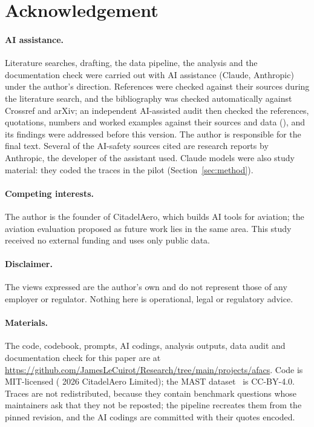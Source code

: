 \documentclass[11pt]{article}
\begin{document}
\section*{Acknowledgement}
\paragraph{AI assistance.} Literature searches, drafting, the data pipeline, the analysis and the documentation check were carried out with AI assistance (Claude, Anthropic) under the author's direction. References were checked against their sources during the literature search, and the bibliography was checked automatically against Crossref and arXiv; an independent AI-assisted audit then checked the references, quotations, numbers and worked examples against their sources and data (), and its findings were addressed before this version. The author is responsible for the final text. Several of the AI-safety sources cited are research reports by Anthropic, the developer of the assistant used. Claude models were also study material: they coded the traces in the pilot (Section~\ref{sec:method}).
\paragraph{Competing interests.} The author is the founder of CitadelAero, which builds AI tools for aviation; the aviation evaluation proposed as future work lies in the same area. This study received no external funding and uses only public data.
\paragraph{Disclaimer.} The views expressed are the author's own and do not represent those of any employer or regulator. Nothing here is operational, legal or regulatory advice.
\paragraph{Materials.} The code, codebook, prompts, AI codings, analysis outputs, data audit and documentation check for this paper are at \url{https://github.com/JamesLeCuirot/Research/tree/main/projects/afacs}. Code is MIT-licensed (\textcopyright{} 2026 CitadelAero Limited); the MAST dataset~\cite{cemri2025mast} is CC-BY-4.0. Traces are not redistributed, because they contain benchmark questions whose maintainers ask that they not be reposted; the pipeline recreates them from the pinned revision, and the AI codings are committed with their quotes encoded.
\end{document}
